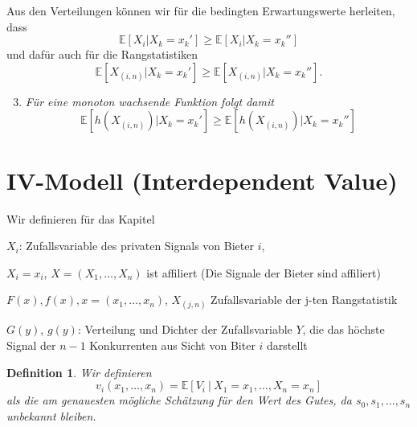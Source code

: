 \documentclass[12pt]{extreport} %
\theoremstyle{named}
\theoremstyle{itshape}
\newtheorem*{definition}{Definition}
\theoremstyle{normal}
\begin{document}
Aus den Verteilungen können wir für die bedingten Erwartungswerte herleiten, dass
	$$ \mathbb{E}\left[ X_{i} \big| X_{k} = x_{k}' \right] \geq \mathbb{E}\left[ X_{i} \big| X_{k} = x_{k}'' \right] $$
und dafür auch für die Rangstatistiken
	$$ \mathbb{E}\left[ X_{(i,n)} \big| X_{k} = x_{k}' \right] \geq \mathbb{E}\left[ X_{(i,n)} \big| X_{k} = x_{k}'' \right]. $$
	\begin{enumerate} \setcounter{enumi}{2}
		\item \textit{Für eine monoton wachsende Funktion folgt damit}
		 $$\mathbb{E}\left[ h\left(X_{(i,n)} \right) \big| X_{k} = x_{k}' \right] \geq \mathbb{E}\left[ h\left(X_{(i,n)} \right)\big| X_{k} = x_{k}'' \right]$$
	\end{enumerate}


\section{IV-Modell (Interdependent Value)}

Wir definieren für das Kapitel

\begin{description}
	\item $X_{i}$: Zufallsvariable des privaten Signals von Bieter $i$,
	\item $X_{i} = x_{i}$, $X = (X_{1}, \dotsc, X_{n})$ ist affiliert (Die Signale der Bieter sind affiliert)
	\item $F(x), f(x), x = (x_1, \dotsc, x_n)$, $X_{(j,n)}$ Zufallsvariable der j-ten Rangstatistik
	\item $G(y)$, $g(y)$: Verteilung und Dichter der Zufallsvariable $Y$, die das höchste Signal der $n-1$ Konkurrenten aus Sicht von Biter $i$ darstellt
\end{description}

\begin{definition}
	Wir definieren 
	$$ v_{i}(x_1, \dotsc, x_{n}) = \mathbb{E}\left[ V_{i} ~\big|~ X_1 = x_1, \dotsc, X_n = x_n \right]$$
	als die am genauesten mögliche Schätzung für den Wert des Gutes, da $s_{0}, s_{1}, \dotsc, s_{n}$ unbekannt bleiben.
\end{definition}
\end{document}
